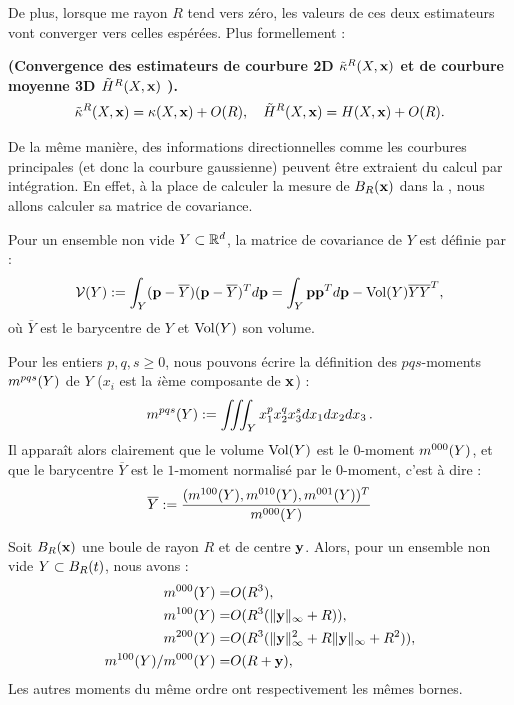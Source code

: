 %
De plus, lorsque me rayon $R$ tend vers zéro, les valeurs de ces deux
estimateurs vont converger vers celles espérées. Plus formellement :
%
\begin{theorem}{\textbf{(Convergence des estimateurs de courbure 2D $\tilde{\kappa}^{R}(X,\mathbf{x})$ et de courbure moyenne 3D $\tilde{H}^{R}(X,\mathbf{x})$ \cite{Pottmann2007}).}}
  \label{theo:pottmann-2d-3d-mean-conv}
  \begin{equation}
    \tilde{\kappa}^{R}(X,\mathbf{x}) = \kappa(X,\mathbf{x}) + O(R),
    \quad\tilde{H}^{R}(X,\mathbf{x}) = H(X,\mathbf{x}) + O(R).
  \end{equation}
\end{theorem}
%
De la même manière, des informations directionnelles comme les courbures
principales (et donc la courbure gaussienne) peuvent être extraient du calcul
par intégration. En effet, à la place de calculer la mesure de $B_{R}(\mathbf{x})$ dans
la , nous allons calculer sa matrice de covariance.
%
\begin{definition}
  \label{def:cov-matrix}
  Pour un ensemble non vide $Y \subset \mathbb{R}^d$, la matrice de covariance de $Y$
  est définie par :
  \begin{equation}
    \mathcal{V}(Y) := \int_Y (\mathbf{p}-\overline{Y})(\mathbf{p}-\overline{Y})^T d\mathbf{p} = \int_Y \mathbf{p} \mathbf{p}^T d\mathbf{p} - \mathrm{Vol}(Y)\overline{Y}\overline{Y}^T,
  \end{equation}
  où $\overline{Y}$ est le barycentre de $Y$ et $\mathrm{Vol}(Y)$ son volume.
\end{definition}
%
Pour les entiers $p, q, s \ge 0$, nous pouvons écrire la définition des $
pqs$-moments $m^{pqs}(Y)$ de $Y$ ($x_i$ est la $i$ème composante de $\mathbf{x}$) :
%
\begin{equation}
  \label{eq:moments}
  m^{pqs}(Y) := \iiint_Y x_1^p x_2^q x_3^s dx_1 dx_2 dx_3\,.
\end{equation}
%
Il apparaît alors clairement que le volume $\mathrm{Vol}(Y)$ est le $0$-moment
$m^{000}(Y)$, et que le barycentre $\overline{Y}$ est le $1$-moment normalisé
par le $0$-moment, c'est à dire :
%
\begin{equation}
  \overline{Y} := \frac{( m^{100}(Y), m^{010}(Y), m^{001}(Y) )^T}{m^{000}(Y)}
\end{equation}
%
\begin{lemma}\label{lem:moment-ball}
  Soit $B_{R}(\mathbf{x})$ une boule de rayon $R$ et de centre $\mathbf{y}$. Alors, pour un
  ensemble non vide $Y \subset B_{R}(t)$, nous avons :
  \begin{align}
    m^{000}(Y) =& O(R^3), \label{eq:ball-moment-0}\\
    m^{100}(Y) =& O(R^3(\|\mathbf{y}\|_\infty + R)), \label{eq:ball-moment-1}\\
    m^{200}(Y) =& O(R^3(\|\mathbf{y}\|^2_\infty + R\|\mathbf{y}\|_\infty + R^2)), \label{eq:ball-moment-2}\\
    m^{100}(Y)/m^{000}(Y) =& O(R+\mathbf{y}), \label{eq:ball-moment-1bis}
  \end{align}
  Les autres moments du même ordre ont respectivement les mêmes bornes.
\end{lemma}
